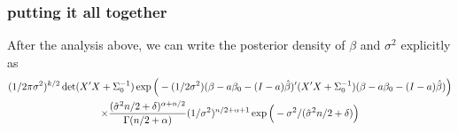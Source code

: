 \subsubsection{putting it all together}

After the analysis above, we can write the posterior density of $\beta$
and $\sigma^2$ explicitly as
\begin{multline*}
  (1/2\pi\sigma^2)^{k/2} \det(X'X + \Sigma_0^{-1})
  \exp\Big(-(1/2\sigma^2) (\beta-a\beta_0-(I-a)\hat{\beta})'(X'X+\Sigma_0^{-1})(\beta-a\beta_0-(I-a)\hat{\beta})\Big) \\
  \times \frac{(\hat{\sigma}^2 n/2 + \delta)^{\alpha + n/2}}{\Gamma(n/2 + \alpha)}
    (1/\sigma^2)^{n/2+\alpha+1}\exp\Big(-\sigma^2/(\hat{\sigma}^2 n/2 + \delta)\Big)
\end{multline*}

